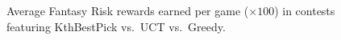 \documentclass[letterpaper]{article}
\numberwithin{equation}{section}
\numberwithin{theorem}{section}
\numberwithin{lemma}{section}
\numberwithin{df}{section}
\begin{document}
\begin{figure}[t]
\centering
{}\hspace{5pt}
\caption[]{Average Fantasy Risk rewards earned per game ($\times 100$) in contests featuring KthBestPick vs.~UCT vs.~Greedy.}
\label{fig:FantRisk2}
\end{figure}


\end{document}

